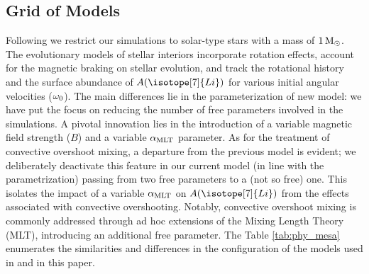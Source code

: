 \documentclass[fleqn,usenatbib]{mnras}
\begin{document}
\subsection{Grid of Models} \label{sec_grid}
Following \citet{Caballero2020} we restrict our simulations to solar-type stars with a mass of $1\,\mathrm{M}_\odot$. The evolutionary models of stellar interiors incorporate rotation effects, account for the magnetic braking on stellar evolution, and track the rotational history and the surface abundance of $A(\isotope[7]{Li})$ for various initial angular velocities ($\omega_{\mathrm{0}}$). The main differences lie in the parameterization of new model: we have put the focus on reducing the number of free parameters involved in the simulations. A pivotal innovation lies in the introduction of a variable magnetic field strength ($B$) and a variable $\alpha_{\mathrm{MLT}}$ parameter. As for the treatment of convective overshoot mixing, a departure from the previous model is evident; we deliberately deactivate this feature in our current model (in line with the \citet{Sonoi2018} parametrization) passing from two free parameters to a (not so free) one. This isolates the impact of a variable $\alpha_{\mathrm{MLT}}$ on $A(\isotope[7]{Li})$ from the effects associated with convective overshooting. Notably, convective overshoot mixing is commonly addressed through ad hoc extensions of the Mixing Length Theory (MLT), introducing an additional free parameter. The Table \ref{tab:phy_mesa} enumerates the similarities and differences in the configuration of the models used in \citet{Caballero2020} and in this paper.\par
\end{document}
